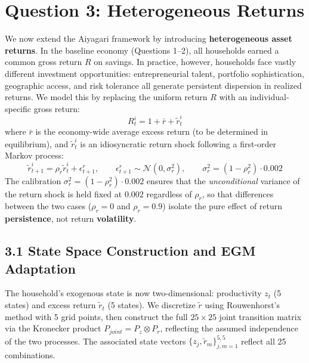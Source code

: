 \documentclass[11pt, a4paper]{article}
\begin{document}
\section*{Question 3: Heterogeneous Returns}

We now extend the Aiyagari framework by introducing \textbf{heterogeneous asset returns}. In the baseline economy (Questions 1--2), all households earned a common gross return $R$ on savings. In practice, however, households face vastly different investment opportunities: entrepreneurial talent, portfolio sophistication, geographic access, and risk tolerance all generate persistent dispersion in realized returns. We model this by replacing the uniform return $R$ with an individual-specific gross return:
\begin{equation}
    R^i_t = 1 + \bar{r} + \tilde{r}^i_t
\end{equation}
where $\bar{r}$ is the economy-wide average excess return (to be determined in equilibrium), and $\tilde{r}^i_t$ is an idiosyncratic return shock following a first-order Markov process:
\begin{equation}
    \tilde{r}^i_{t+1} = \rho_r \tilde{r}^i_t + \epsilon^r_{t+1}, \qquad \epsilon^r_{t+1} \sim \mathcal{N}(0, \sigma^2_r), \qquad \sigma^2_r = (1 - \rho_r^2) \cdot 0.002
\end{equation}
The calibration $\sigma^2_r = (1 - \rho_r^2) \cdot 0.002$ ensures that the \emph{unconditional} variance of the return shock is held fixed at $0.002$ regardless of $\rho_r$, so that differences between the two cases ($\rho_r = 0$ and $\rho_r = 0.9$) isolate the pure effect of return \textbf{persistence}, not return \textbf{volatility}.

\subsection*{3.1 State Space Construction and EGM Adaptation}

The household's exogenous state is now two-dimensional: productivity $z_t$ (5 states) and excess return $\tilde{r}_t$ (5 states). We discretize $\tilde{r}$ using Rouwenhorst's method with 5 grid points, then construct the full $25 \times 25$ joint transition matrix via the Kronecker product $P_{joint} = P_z \otimes P_r$, reflecting the assumed independence of the two processes. The associated state vectors $\{z_j, \tilde{r}_m\}_{j,m=1}^{5,5}$ reflect all 25 combinations.
\end{document}
